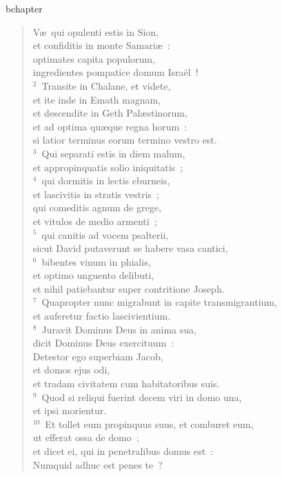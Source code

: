 bchapter\begin{verse}\vspace{-19pt}V\ae\ qui opulenti estis in Sion,\\ et confiditis in monte Samari\ae~:\\ optimates capita populorum,\\ ingredientes pompatice domum Isra\"el~!\\
${}^{2}$~Transite in Chalane, et videte,\\ et ite inde in Emath magnam,\\ et descendite in Geth Pal\ae stinorum,\\ et ad optima qu\ae que regna horum~:\\ si latior terminus eorum termino vestro est.\\
${}^{3}$~Qui separati estis in diem malum,\\ et appropinquatis solio iniquitatis~;\\
${}^{4}$~qui dormitis in lectis eburneis,\\ et lascivitis in stratis vestris~;\\ qui comeditis agnum de grege,\\ et vitulos de medio armenti~;\\
${}^{5}$~qui canitis ad vocem psalterii,\\ sicut David putaverunt se habere vasa cantici,\\
${}^{6}$~bibentes vinum in phialis,\\ et optimo unguento delibuti,\\ et nihil patiebantur super contritione Joseph.\\
${}^{7}$~Quapropter nunc migrabunt in capite transmigrantium,\\ et auferetur factio lascivientium.\\
${}^{8}$~Juravit Dominus Deus in anima sua,\\ dicit Dominus Deus exercituum~:\\ Detestor ego superbiam Jacob,\\ et domos ejus odi,\\ et tradam civitatem cum habitatoribus suis.\\
${}^{9}$~Quod si reliqui fuerint decem viri in domo una,\\ et ipsi morientur.\\
${}^{10}$~Et tollet eum propinquus suus, et comburet eum,\\ ut efferat ossa de domo~;\\ et dicet ei, qui in penetralibus domus est~:\\ Numquid adhuc est penes te~?\\

\end{verse}
